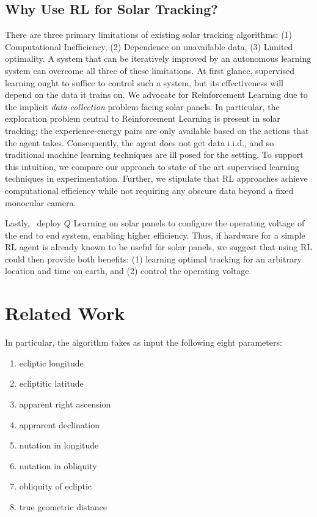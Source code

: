 \documentclass[11pt]{article}
\begin{document}
\subsection{Why Use RL for Solar Tracking?}

There are three primary limitations of existing solar tracking algorithms: (1) Computational Inefficiency, (2) Dependence on unavailable data, (3) Limited optimality. A system that can be iteratively improved by an autonomous learning system can overcome all three of these limitations. At first glance, supervised learning ought to suffice to control such a system, but its effectiveness will depend on the data it trains on. We advocate for Reinforcement Learning due to the implicit {\it data collection} problem facing solar panels. In particular, the exploration problem central to Reinforcement Learning is present in solar tracking; the experience-energy pairs are only available based on the actions that the agent takes. Consequently, the agent does not get data i.i.d., and so traditional machine learning techniques are ill posed for the setting. To support this intuition, we compare our approach to state of the art supervised learning techniques in experimentation. Further, we stipulate that RL approaches achieve computational efficiency while not requiring any obscure data beyond a fixed monocular camera.

Lastly,~\citet{Hsu2015} deploy $Q$ Learning on solar panels to configure the operating voltage of the end to end system, enabling higher efficiency. Thus, if hardware for a simple RL agent is already known to be useful for solar panels, we suggest that using RL could then provide both benefits: (1) learning optimal tracking for an arbitrary location and time on earth, and (2) control the operating voltage. \\



\section{Related Work}


In particular, the algorithm takes as input the following eight parameters:
\begin{enumerate}
\item ecliptic longitude
\item ecliptitic latitude
\item apparent right ascension
\item apprarent declination
\item nutation in longitude
\item nutation in obliquity
\item obliquity of ecliptic
\item true geometric distance
\end{enumerate}
\end{document}
